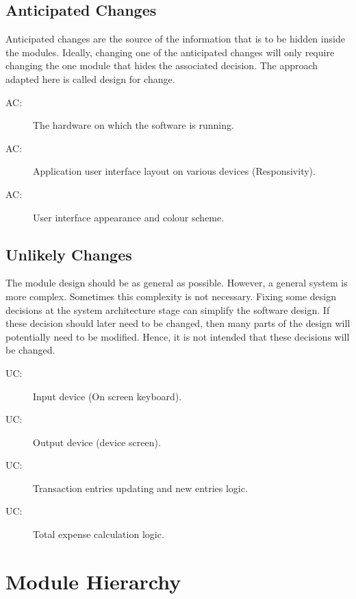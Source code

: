 \documentclass[12pt, titlepage]{article}
\newcounter{acnum}
\newcommand{\actheacnum}{AC\theacnum}
\newcounter{ucnum}
\newcommand{\uctheucnum}{UC\theucnum}
\begin{document}
\subsection{Anticipated Changes} \label{SecAchange}

Anticipated changes are the source of the information that is to be hidden
inside the modules. Ideally, changing one of the anticipated changes will only
require changing the one module that hides the associated decision. The approach
adapted here is called design for
change.

\begin{description}
\item[ \actheacnum \label{ac1}:] The hardware on which the software is running.
\item[ \actheacnum \label{ac2}:] Application user interface layout on various devices (Responsivity).
\item[ \actheacnum \label{ac3}:] User interface appearance and colour scheme.
\end{description}

\subsection{Unlikely Changes} \label{SecUchange}

The module design should be as general as possible. However, a general system is
more complex. Sometimes this complexity is not necessary. Fixing some design
decisions at the system architecture stage can simplify the software design. If
these decision should later need to be changed, then many parts of the design
will potentially need to be modified. Hence, it is not intended that these
decisions will be changed.

\begin{description}
\item[ \uctheucnum \label{uc1}:] Input device (On screen keyboard).
\item[ \uctheucnum \label{uc2}:] Output device (device screen).
\item[ \uctheucnum \label{uc3}:] Transaction entries updating and new entries logic.
\item[ \uctheucnum \label{uc4}:] Total expense calculation logic.
\end{description}

\section{Module Hierarchy} \label{SecMH}
\end{document}
